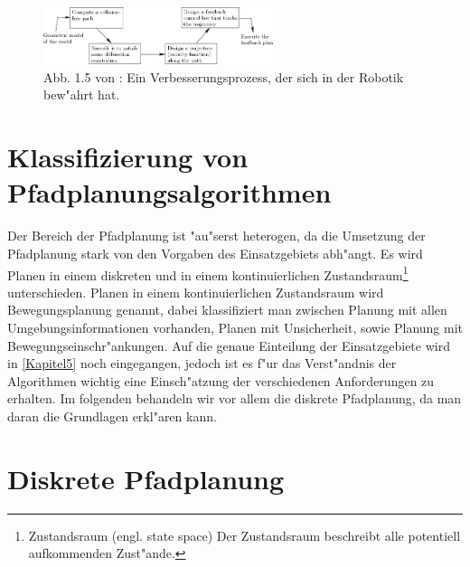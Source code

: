 \begin{figure} %
	\centering
	\includegraphics[width=0.6\textwidth]{images/img247.png}
	\caption{Abb. 1.5 von \cite[~S. 20]{Lav06}:  Ein Verbesserungsprozess, der sich in der Robotik bew"ahrt hat.}
	\label{lav02}
\end{figure}

\section{Klassifizierung von Pfadplanungsalgorithmen} %
Der Bereich der Pfadplanung ist "au"serst heterogen, da die Umsetzung der Pfadplanung stark von den Vorgaben des Einsatzgebiets abh"angt. 
Es wird Planen in einem diskreten und in einem kontinuierlichen Zustandsraum\footnote{Zustandsraum (engl. state space) Der Zustandsraum beschreibt alle potentiell aufkommenden Zust"ande.} unterschieden. Planen in einem kontinuierlichen Zustandsraum wird Bewegungsplanung genannt, dabei klassifiziert man zwischen Planung mit allen Umgebungsinformationen vorhanden, Planen mit Unsicherheit, sowie Planung mit Bewegungseinschr"ankungen.
Auf die genaue Einteilung der Einsatzgebiete wird in \ref{Kapitel5} noch eingegangen, jedoch ist es f"ur das Verst"andnis der Algorithmen wichtig eine Einsch"atzung der verschiedenen Anforderungen zu erhalten. Im folgenden behandeln wir vor allem die diskrete Pfadplanung, da man daran die Grundlagen erkl"aren kann. \cite[~S. 24ff]{Lav06} 

\section{Diskrete Pfadplanung} %

